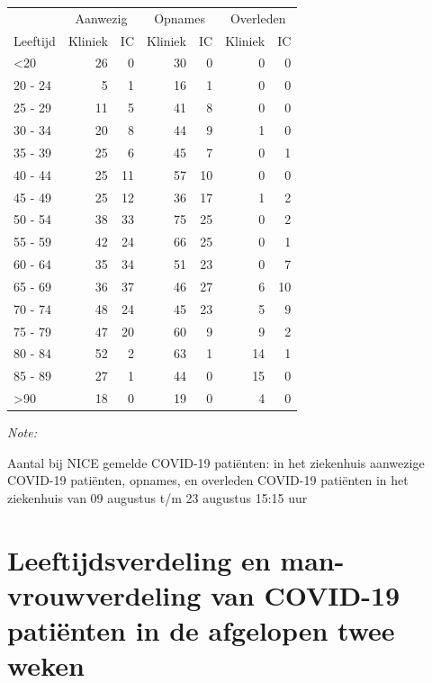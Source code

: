 \documentclass[
  english,
  man,floatsintext]{apa6}
\begin{document}
\begin{table}
\centering\begingroup\fontsize{10}{12}\selectfont

\begin{threeparttable}
\begin{tabular}{lrrrrrr}
\toprule
\multicolumn{1}{c}{ } & \multicolumn{2}{c}{Aanwezig} & \multicolumn{2}{c}{Opnames} & \multicolumn{2}{c}{Overleden} \\
\cmidrule(l{3pt}r{3pt}){2-3} \cmidrule(l{3pt}r{3pt}){4-5} \cmidrule(l{3pt}r{3pt}){6-7}
Leeftijd & Kliniek & IC & Kliniek & IC & Kliniek & IC\\
\midrule
<20 & 26 & 0 & 30 & 0 & 0 & 0\\
20 - 24 & 5 & 1 & 16 & 1 & 0 & 0\\
25 - 29 & 11 & 5 & 41 & 8 & 0 & 0\\
30 - 34 & 20 & 8 & 44 & 9 & 1 & 0\\
35 - 39 & 25 & 6 & 45 & 7 & 0 & 1\\
40 - 44 & 25 & 11 & 57 & 10 & 0 & 0\\
45 - 49 & 25 & 12 & 36 & 17 & 1 & 2\\
50 - 54 & 38 & 33 & 75 & 25 & 0 & 2\\
55 - 59 & 42 & 24 & 66 & 25 & 0 & 1\\
60 - 64 & 35 & 34 & 51 & 23 & 0 & 7\\
65 - 69 & 36 & 37 & 46 & 27 & 6 & 10\\
70 - 74 & 48 & 24 & 45 & 23 & 5 & 9\\
75 - 79 & 47 & 20 & 60 & 9 & 9 & 2\\
80 - 84 & 52 & 2 & 63 & 1 & 14 & 1\\
85 - 89 & 27 & 1 & 44 & 0 & 15 & 0\\
>90 & 18 & 0 & 19 & 0 & 4 & 0\\
\bottomrule
\end{tabular}
\begin{tablenotes}
\item \textit{Note: } 
\item Aantal bij NICE gemelde COVID-19 patiënten: in het ziekenhuis aanwezige COVID-19 patiënten, opnames, en overleden COVID-19 patiënten in het ziekenhuis van 09 augustus t/m 23 augustus 15:15 uur
\end{tablenotes}
\end{threeparttable}
\endgroup{}
\end{table}

\newpage

\hypertarget{leeftijdsverdeling-en-man-vrouwverdeling-van-covid-19-patiuxebnten-in-de-afgelopen-twee-weken}{%
\section{Leeftijdsverdeling en man-vrouwverdeling van COVID-19 patiënten in de afgelopen twee weken}\label{leeftijdsverdeling-en-man-vrouwverdeling-van-covid-19-patiuxebnten-in-de-afgelopen-twee-weken}}
\end{document}

